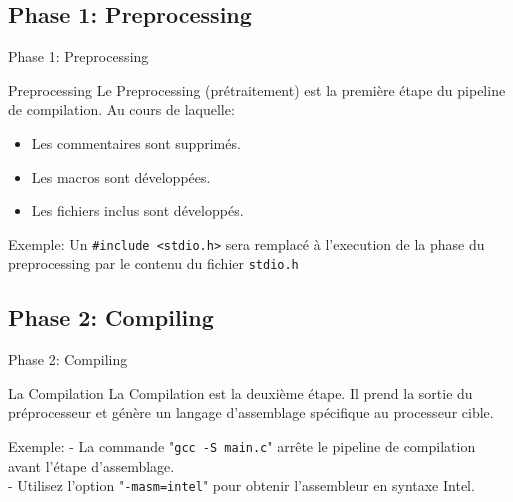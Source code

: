\documentclass{beamer}
\begin{document}
\begin{darkframes}
  	\subsection{Phase 1: Preprocessing}
  	\begin{frame}{Phase 1: Preprocessing}
  		\begin{block}{Preprocessing}
  			Le \alert{Preprocessing} (prétraitement) est la \alert{première} étape du pipeline de compilation. Au cours de laquelle:
  			\begin{itemize}
  				\item Les commentaires sont supprimés.
  				\item Les macros sont développées.
  				\item Les fichiers inclus sont développés.
  			\end{itemize}
  		\end{block}
  	  	\begin{exampleblock}{Exemple:}
  			Un \texttt{\#include <stdio.h>} sera remplacé à l'execution de la phase du preprocessing par le contenu du fichier \texttt{stdio.h}
  		\end{exampleblock}
  	\end{frame}
  	
  	\subsection{Phase 2: Compiling}
  	\begin{frame}{Phase 2: Compiling}
	  	\begin{block}{La Compilation}
	  		La \alert{Compilation} est la deuxième étape. Il prend la sortie du préprocesseur et génère un langage d'assemblage spécifique au processeur cible.
	  	\end{block}
		\begin{exampleblock}{Exemple:}
			- La commande "\texttt{gcc -S main.c}" arrête le pipeline de compilation avant l'étape d'assemblage.\\
			- Utilisez l'option "\texttt{-masm=intel}" pour obtenir l'assembleur en syntaxe Intel.
		\end{exampleblock}
  	\end{frame}
  

\end{darkframes}
\end{document}
